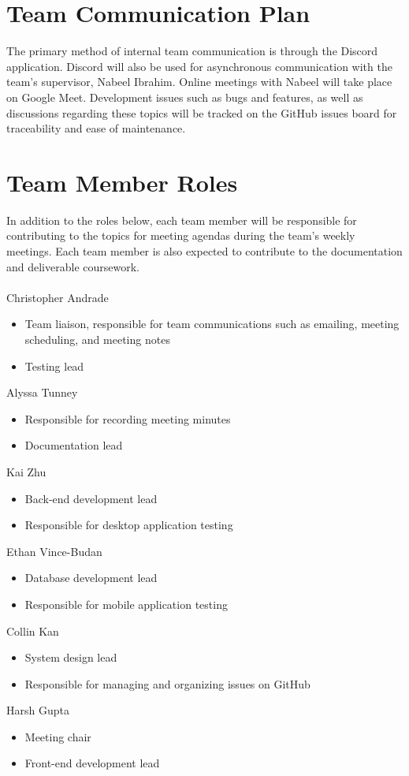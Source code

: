 \documentclass{article}
\begin{document}
\section{Team Communication Plan}

The primary method of internal team communication is through the Discord
application. Discord will also be used for asynchronous communication with the
team's supervisor, Nabeel Ibrahim. Online meetings with Nabeel will take place
on Google Meet. Development issues such as bugs and features, as well as
discussions regarding these topics will be tracked on the GitHub issues board
for traceability and ease of maintenance.

\section{Team Member Roles}

In addition to the roles below, each team member will be responsible for
contributing to the topics for meeting agendas during the team's weekly
meetings. Each team member is also expected to contribute to the documentation
and deliverable coursework.\\

\\\noindent Christopher Andrade
\begin{itemize}
	\item Team liaison, responsible for team communications such as emailing,
	      meeting scheduling, and meeting notes
	\item Testing lead
\end{itemize}
Alyssa Tunney
\begin{itemize}
	\item Responsible for recording meeting minutes
	\item Documentation lead
\end{itemize}
Kai Zhu
\begin{itemize}
	\item Back-end development lead
	\item Responsible for desktop application testing
\end{itemize}
Ethan Vince-Budan
\begin{itemize}
	\item Database development lead
	\item Responsible for mobile application testing
\end{itemize}
Collin Kan
\begin{itemize}
	\item System design lead
	\item Responsible for managing and organizing issues on GitHub
\end{itemize}
Harsh Gupta
\begin{itemize}
	\item Meeting chair
	\item Front-end development lead
\end{itemize}
\end{document}
